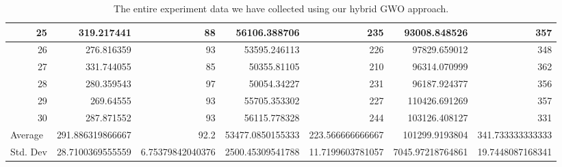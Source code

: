 \begin{table}
\begin{adjustwidth}{}{}
{{\begin{tabular}{|r|r|r|r|r|r|r|}
\hline
25                                         & 319.217441                   & 88                                    & 56106.388706                   & 235                                   & 93008.848526                 & 357                                    \\ 
\hline
26                                         & 276.816359                   & 93                                    & 53595.246113                   & 226                                   & 97829.659012                 & 348                                    \\ 
\hline
27                                         & 331.744055                   & 85                                    & 50355.81105                    & 210                                   & 96314.070999                 & 362                                    \\ 
\hline
28                                         & 280.359543                   & 97                                    & 50054.34227                    & 231                                   & 96187.924377                 & 356                                    \\ 
\hline
29                                         & 269.64555                    & 93                                    & 55705.353302                   & 227                                   & 110426.691269                & 357                                    \\ 
\hline
30                                         & 287.871552                   & 93                                    & 56115.778328                   & 244                                   & 103126.408127                & 331                                    \\ 
\hline
\multicolumn{1}{|l|}{Average}              & 291.886319866667             & 92.2                                  & 53477.0850155333               & 223.566666666667                      & 101299.9193804               & 341.733333333333                       \\ 
\hline
\multicolumn{1}{|l|}{Std. Dev}             & 28.7100369555559             & 6.75379842040376                      & 2500.45309541788               & 11.7199603781057                      & 7045.97218764861             & 19.7448087168341                       \\
\hline
\end{tabular}}}
\end{adjustwidth}
\caption{The entire experiment data we have collected using our hybrid GWO approach.}
\label{full-data-gwo}
\end{table}

